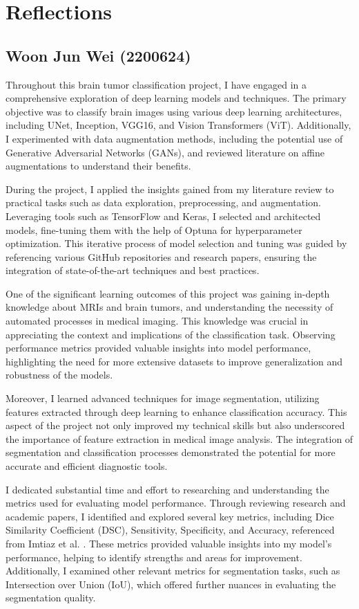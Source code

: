 \section{Reflections}\label{s:reflections}

\subsection{Woon Jun Wei (2200624)}\label{ss:wjw}

Throughout this brain tumor classification project, I have engaged in a comprehensive exploration of deep learning models and techniques. The primary objective was to classify brain images using various deep learning architectures, including UNet, Inception, VGG16, and Vision Transformers (ViT). Additionally, I experimented with data augmentation methods, including the potential use of Generative Adversarial Networks (GANs), and reviewed literature on affine augmentations to understand their benefits.

During the project, I applied the insights gained from my literature review to practical tasks such as data exploration, preprocessing, and augmentation. Leveraging tools such as TensorFlow and Keras, I selected and architected models, fine-tuning them with the help of Optuna for hyperparameter optimization. This iterative process of model selection and tuning was guided by referencing various GitHub repositories and research papers, ensuring the integration of state-of-the-art techniques and best practices.

One of the significant learning outcomes of this project was gaining in-depth knowledge about MRIs and brain tumors, and understanding the necessity of automated processes in medical imaging. This knowledge was crucial in appreciating the context and implications of the classification task. Observing performance metrics provided valuable insights into model performance, highlighting the need for more extensive datasets to improve generalization and robustness of the models.

Moreover, I learned advanced techniques for image segmentation, utilizing features extracted through deep learning to enhance classification accuracy. This aspect of the project not only improved my technical skills but also underscored the importance of feature extraction in medical image analysis. The integration of segmentation and classification processes demonstrated the potential for more accurate and efficient diagnostic tools.

I dedicated substantial time and effort to researching and understanding the metrics used for evaluating model performance. Through reviewing research and academic papers, I identified and explored several key metrics, including Dice Similarity Coefficient (DSC), Sensitivity, Specificity, and Accuracy, referenced from Imtiaz et al. \cite{imtiaz_brain_2023}. These metrics provided valuable insights into my model's performance, helping to identify strengths and areas for improvement. Additionally, I examined other relevant metrics for segmentation tasks, such as Intersection over Union (IoU), which offered further nuances in evaluating the segmentation quality.

